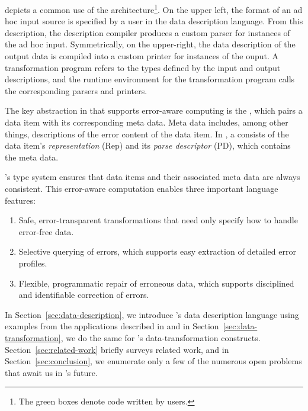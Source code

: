 
 depicts a common use of the \datatype{}
architecture\footnote{The green boxes denote code written by users.}.
On the upper left, the format of an ad hoc input source is specified
by a user in the \datatype{} data description language.  From this
description, the \datatype{} description compiler produces a custom
parser for instances of the ad hoc input.  Symmetrically, on the
upper-right, the  data description of the output data is compiled into
a custom printer for instances of the ouput.  A \datatype{}
transformation program refers to the types defined by the input and
output descriptions, and the \datatype{} runtime environment for the
transformation program calls the corresponding parsers and printers.

The key abstraction in \datatype{} that supports error-aware computing
is the \emph{\pvalue}, which pairs a data item with its
corresponding meta data.  Meta data includes, among other things,
descriptions of the error content of the data item.  In
, a \pvalue{} consists of the data item's
\emph{representation} (Rep) and its \emph{parse descriptor} (PD),
which contains the meta data.

\datatype{}'s type system ensures
that data items and their associated meta data are always consistent.
This error-aware computation enables three important language
features:
\begin{enumerate}
\item Safe, error-transparent transformations that need only specify
  how to handle error-free data.
\item Selective querying of errors, which supports easy extraction of detailed error profiles.
\item Flexible, programmatic repair of erroneous data, which supports
  disciplined and identifiable correction of errors.
\end{enumerate}



In Section~\ref{sec:data-description}, we introduce \datatype{}'s data
description language using examples from the applications described in
 and in
Section~\ref{sec:data-transformation}, we do the same for
\datatype{}'s data-transformation constructs.
Section~\ref{sec:related-work} briefly surveys related work, and in
Section~\ref{sec:conclusion}, we enumerate only a few of the numerous
open problems that await us in \datatype{}'s future.

